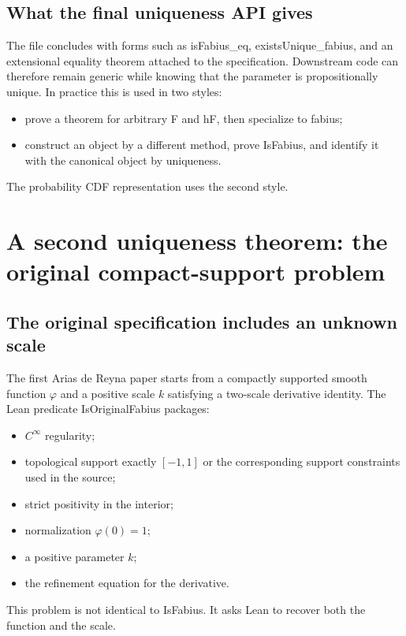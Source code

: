 \documentclass[11pt,a4paper,openany]{book}
\def\decl#1{#1}
\def\code#1{#1}
\newcommand{\decl}[1]{\texttt{\detokenize{#1}}}
\newcommand{\code}[1]{\texttt{\detokenize{#1}}}
\begin{document}
\section{What the final uniqueness API gives}
The file concludes with forms such as \decl{isFabius_eq},
\decl{existsUnique_fabius}, and an extensional equality theorem attached to the
specification.  Downstream code can therefore remain generic while knowing
that the parameter is propositionally unique.  In practice this is used in two
styles:
\begin{itemize}
  \item prove a theorem for arbitrary \code{F} and \code{hF}, then specialize
to \decl{fabius};
  \item construct an object by a different method, prove \decl{IsFabius}, and
identify it with the canonical object by uniqueness.
\end{itemize}
The probability CDF representation uses the second style.

\chapter{A second uniqueness theorem: the original compact-support problem}
\label{ch:original-uniqueness}

\section{The original specification includes an unknown scale}
The first Arias de Reyna paper starts from a compactly supported smooth
function $\varphi$ and a positive scale $k$ satisfying a two-scale derivative
identity.  The Lean predicate \decl{IsOriginalFabius} packages:
\begin{itemize}
  \item $C^\infty$ regularity;
  \item topological support exactly $[-1,1]$ or the corresponding support
        constraints used in the source;
  \item strict positivity in the interior;
  \item normalization $\varphi(0)=1$;
  \item a positive parameter $k$;
  \item the refinement equation for the derivative.
\end{itemize}
This problem is not identical to \decl{IsFabius}.  It asks Lean to recover both
the function and the scale.
\end{document}
